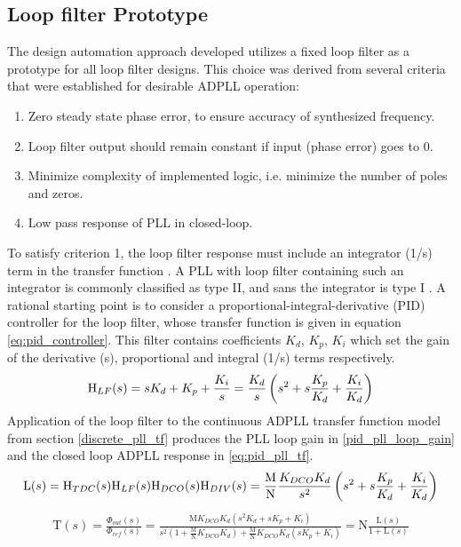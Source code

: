 \subsection{Loop filter Prototype}
	The design automation approach developed utilizes a fixed loop filter as a prototype for all loop filter designs. This choice was derived from several criteria that were established for desirable ADPLL operation:
	\begin{enumerate}[itemsep=0pt,label=\protect\mycirc{\arabic*}]
		\setlength\itemsep{-0.8em}
		\item Zero steady state phase error, to ensure accuracy of synthesized frequency.
		\item Loop filter output should remain constant if input (phase error) goes to 0.
		\item Minimize complexity of implemented logic, i.e. minimize the number of poles and zeros.
		\item Low pass response of PLL in closed-loop.
	\end{enumerate}
	To satisfy criterion 1, the loop filter response must include an integrator (1/s) term in the transfer function \cite{ogata_2010}. A PLL with loop filter containing such an integrator is commonly classified as type II, and sans the integrator is type I \cite{gardner_2005}. A rational starting point is to consider a proportional-integral-derivative (PID) controller \cite{ogata_2010_pid} for the loop filter, whose transfer function is given in equation \ref{eq:pid_controller}. This filter contains coefficients $K_d$, $K_p$, $K_i$ which set the gain of the derivative (s), proportional and integral (1/s) terms respectively. 
	\begin{equation}\label{eq:pid_controller}
		\textnormal{H}_{LF}(s) = sK_d + K_p + \frac{K_i}{s} = \frac{K_d}{s}\left(s^2 + s\frac{K_p}{K_d} + \frac{K_i}{K_d}\right)
	\end{equation}
	Application of the loop filter to the continuous ADPLL transfer function model from section \ref{discrete_pll_tf} produces the PLL loop gain in \ref{pid_pll_loop_gain} and the closed loop ADPLL response in \ref{eq:pid_pll_tf}.
	\begin{equation} \label{pid_pll_loop_gain}
		\mathrm{L}(s) = \textnormal{H}_{TDC}(s)\textnormal{H}_{LF}(s)\textnormal{H}_{DCO}(s)\textnormal{H}_{DIV}(s) = \frac{\mathrm{M}}{\mathrm{N}}\frac{K_{DCO}K_d}{s^2}\left(s^2 + s\frac{K_p}{K_d} + \frac{K_i}{K_d}\right)
	\end{equation}
	\begin{align} \label{eq:pid_pll_tf}
		\mathrm{T}(s) = \frac{\Phi_{out}(s)}{\Phi_{ref}(s)} = \frac{\mathrm{M}K_{DCO}K_{d}\left(s^2K_d + sK_p + K_i\right)}{s^2\left(1 + \frac{\mathrm{M}}{\mathrm{N}}K_{DCO}K_d\right) + \frac{\mathrm{M}}{\mathrm{N}}K_{DCO}K_d\left(sK_p + K_i\right)} = \mathrm{N}\frac{\mathrm{L}(s)}{1 + \mathrm{L}(s)}
	\end{align}
